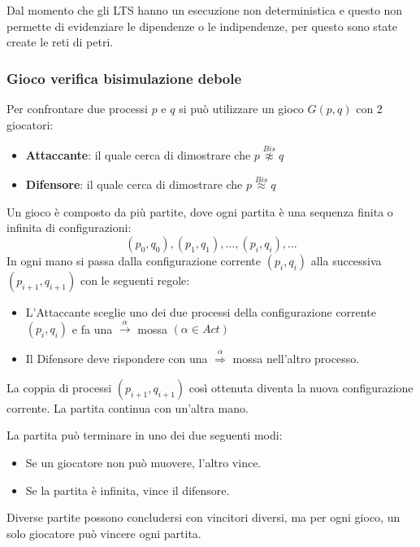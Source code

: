 Dal momento che gli LTS hanno un esecuzione non deterministica e questo
non permette di evidenziare le dipendenze o le indipendenze, per questo sono
state create le reti di petri.
\subsubsection{Gioco verifica bisimulazione debole}
Per confrontare due processi $p$ e $q$ si può utilizzare un gioco $G(p, q)$ con
2 giocatori:
\begin{itemize}
    \item \textbf{Attaccante}: il quale cerca di dimostrare che $p
              \stackrel{Bis}{\not\approx} q$
    \item \textbf{Difensore}: il quale cerca di dimostrare che $p
              \stackrel{Bis}{\approx} q$
\end{itemize}
Un gioco è composto da più partite, dove ogni partita è una sequenza finita o
infinita di configurazioni: $$(p_0, q_0), (p_1, q_1), \dots, (p_i, q_i), \dots$$
In ogni mano si passa dalla configurazione corrente $(p_i, q_i)$ alla successiva
$(p_{i + 1}, q_{i + 1})$ con le seguenti regole:
\begin{itemize}
    \item L'Attaccante sceglie uno dei due processi della configurazione corrente
          $(p_i, q_i)$ e fa una $\xrightarrow{\alpha}$ mossa $(\alpha \in Act)$
    \item Il Difensore deve rispondere con una $\stackrel{\alpha}{\Rightarrow}$
          mossa nell'altro processo.
\end{itemize}
La coppia di processi $(p_{i+1}, q_{i+1})$ così ottenuta diventa la nuova
configurazione corrente. La partita continua con un'altra mano.

La partita può terminare in uno dei due seguenti modi:
\begin{itemize}
    \item Se un giocatore non può muovere, l'altro vince.
    \item Se la partita è infinita, vince il difensore.
\end{itemize}
Diverse partite possono concludersi con vincitori diversi, ma per ogni gioco, un
solo giocatore può vincere ogni partita.

